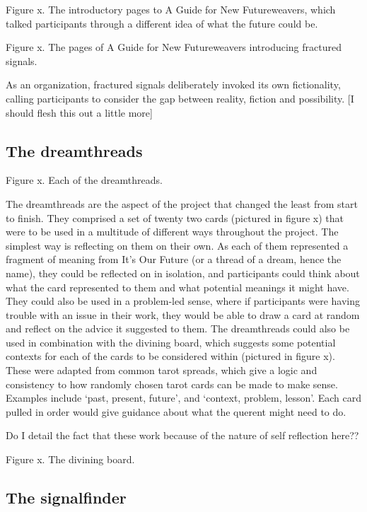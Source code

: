 Figure x.  The introductory pages to A Guide for New Futureweavers, which talked participants through a different idea of what the future could be. 

Figure x. The pages of A Guide for New Futureweavers introducing fractured signals.

As an organization, fractured signals deliberately invoked its own fictionality, calling participants to consider the gap between reality, fiction and possibility.  [I should flesh this out a little more]

\subsection{The dreamthreads}

Figure x. Each of the dreamthreads. 

The dreamthreads are the aspect of the project that changed the least from start to finish. They comprised a set of twenty two cards (pictured in figure x) that were to be used in a multitude of different ways throughout the project. The simplest way is reflecting on them on their own. As each of them represented a fragment of meaning from It’s Our Future (or a thread of a dream, hence the name), they could be reflected on in isolation, and participants could think about what the card represented to them and what potential meanings it might have. They could also be used in a problem-led sense, where if participants were having trouble with an issue in their work, they would be able to draw a card at random and reflect on the advice it suggested to them.
	The dreamthreads could also be used in combination with the divining board, which suggests some potential contexts for each of the cards to be considered within (pictured in figure x). These were adapted from common tarot spreads, which give a logic and consistency to how randomly chosen tarot cards can be made to make sense. Examples include ‘past, present, future’, and ‘context, problem, lesson’. Each card pulled in order would give guidance about what the querent might need to do. 

Do I detail the fact that these work because of the nature of self reflection here??

Figure x. The divining board.

\subsection{The signalfinder}

